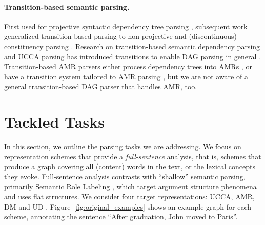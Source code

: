 \documentclass[11pt,a4paper]{article}
\newcommand{\oa}[1]{\footnote{\color{red}OA: #1}}
\begin{document}
\paragraph{Transition-based semantic parsing.}

First used for projective syntactic dependency tree parsing
\cite{nivre2008algorithms},
subsequent work generalized transition-based parsing to non-projective and (discontinuous) constituency
parsing \cite{nivre2009non,zhang2009transition,maier-lichte:2016:DiscoNLP}.
Research on transition-based semantic dependency parsing and UCCA parsing
has introduced transitions to enable DAG parsing in general
\cite{sagae2008shift,ribeyre-villemontedelaclergerie-seddah:2014:SemEval,du-EtAl:2015:SemEval,hershcovich2017a}.
Transition-based AMR parsers either process dependency trees into AMRs
\cite{wang-xue-pradhan:2015:ACL-IJCNLP,wang2015transition,wang-EtAl:2016:SemEval,goodman2016noise},
or have a transition system tailored to AMR parsing \citet{zhou2016amr,damonte-17,D17-1130},
but we are not aware of a general transition-based DAG parser that handles AMR, too.



\section{Tackled Tasks}\label{sec:tasks}

In this section, we outline the parsing tasks we are addressing.
We focus on representation schemes that provide a \textit{full-sentence} analysis,
that is, schemes that produce a graph covering all (content) words in the text, or the
lexical concepts they evoke.
Full-sentence analysis contrasts with ``shallow'' semantic parsing,
primarily Semantic Role Labeling
\cite[SRL;][]{Palmer:05,gildea2002automatic,swayamdipta2017frame,ringgaard2017sling},
which target argument structure phenomena and uses flat structures.
We consider four target representations: UCCA, AMR, DM and UD
\cite[Universal Dependencies; ][]{nivre2016universal}.
Figure~\ref{fig:original_examples} shows an example graph for each scheme,
annotating the sentence ``After graduation, John moved to Paris''.

\end{document}
